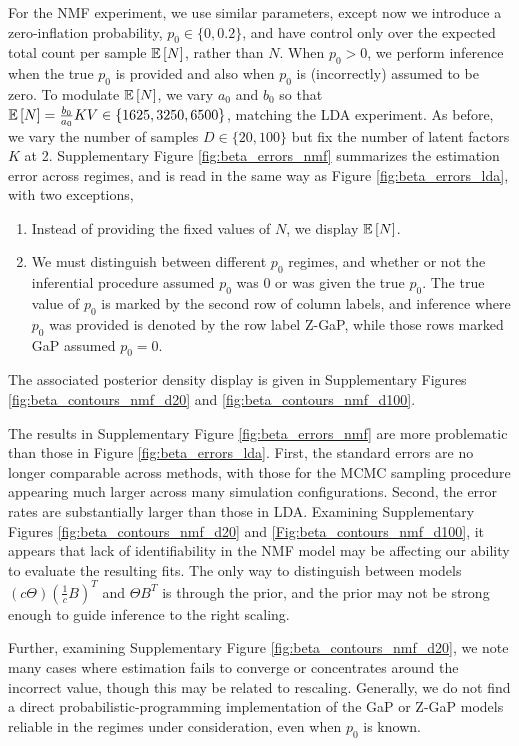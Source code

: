 \documentclass[oupdraft]{bio}
\begin{document}
For the NMF experiment, we use similar parameters, except now we introduce a
zero-inflation probability, $p_{0} \in \{0, 0.2\}$, and have control only over
the expected total count per sample $\mathbb{E}\left[{N}\right]$, rather than $N$. When $p_{0} >
0$, we perform inference when the true $p_0$ is provided and also when $p_{0}$
is (incorrectly) assumed to be zero. To modulate $\mathbb{E}\left[{N}\right]$, we vary $a_{0}$ and
$b_{0}$ so that $\mathbb{E}\left[{N}\right] = \frac{b_{0}}{a_{0}}KV \in \{1625, 3250, 6500\}$,
matching the LDA experiment. As before, we vary the number of samples $D \in
\{20, 100\}$ but fix the number of latent factors $K$ at 2. Supplementary Figure
\ref{fig:beta_errors_nmf} summarizes the estimation error across regimes, and is
read in the same way as Figure \ref{fig:beta_errors_lda}, with two exceptions,
\begin{enumerate}
\item Instead of providing the fixed values of $N$, we display $\mathbb{E}\left[{N}\right]$.
\item We must distinguish between different $p_{0}$ regimes, and whether or not
  the inferential procedure assumed $p_{0}$ was 0 or was given the true $p_{0}$.
  The true value of $p_0$ is marked by the second row of column labels, and
  inference where $p_{0}$ was provided is denoted by the row label Z-GaP, while
  those rows marked GaP assumed $p_{0} = 0$.
\end{enumerate}
The associated posterior density display is given in Supplementary Figures
\ref{fig:beta_contours_nmf_d20} and \ref{fig:beta_contours_nmf_d100}.

The results in Supplementary Figure \ref{fig:beta_errors_nmf} are more
problematic than those in Figure \ref{fig:beta_errors_lda}. First, the standard
errors are no longer comparable across methods, with those for the MCMC sampling
procedure appearing much larger across many simulation configurations. Second,
the error rates are substantially larger than those in LDA. Examining
Supplementary Figures \ref{fig:beta_contours_nmf_d20} and
\ref{Fig:beta_contours_nmf_d100}, it appears that lack of identifiability in the
NMF model may be affecting our ability to evaluate the resulting fits. The only
way to distinguish between models $\left(c\Theta\right)\left(\frac{1}{c}
B\right)^{T}$ and $\Theta B^{T}$ is through the prior, and the prior may not be
strong enough to guide inference to the right scaling.

Further, examining Supplementary Figure \ref{fig:beta_contours_nmf_d20}, we note
many cases where estimation fails to converge or concentrates around the
incorrect value, though this may be related to rescaling. Generally, we do not
find a direct probabilistic-programming implementation of the GaP or Z-GaP
models reliable in the regimes under consideration, even when $p_{0}$ is known.
\end{document}

